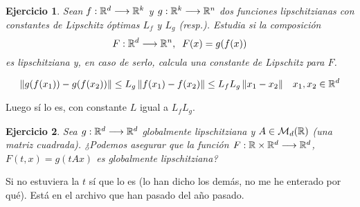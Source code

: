 \documentclass[12pt]{report}
\newtheorem{ejercicio}{Ejercicio}
\theoremstyle{definition}
\theoremstyle{remark}
\begin{document}
\begin{ejercicio}
Sean $f : \mathbb{R}^d \longrightarrow \mathbb{R}^k$ y $g : \mathbb{R}^k \longrightarrow \mathbb{R}^n$ dos funciones lipschitzianas con constantes de Lipschitz óptimas $L_f$ y $L_g$ (resp.). Estudia si la composición
\[
F : \mathbb{R}^d \longrightarrow \mathbb{R}^n, \;\; F(x)=g(f(x))
\]
es lipschitziana y, en caso de serlo, calcula una constante de Lipschitz para $F$.
\end{ejercicio}

\[
\left\lVert g(f(x_1))-g(f(x_2))\right\rVert\leq L_g\left\lVert f(x_1)-f(x_2)\right\rVert\leq L_fL_g\left\lVert x_1-x_2\right\rVert \;\;\; x_1,x_2\in \mathbb{R}^d
\]

Luego sí lo es, con constante $L$ igual a $L_fL_g$.

\begin{ejercicio}
Sea $g : \mathbb{R}^d \longrightarrow \mathbb{R}^d$ globalmente lipschitziana y $A\in\mathcal{M}_d(\mathbb{R})$ (una matriz cuadrada). ¿Podemos asegurar que la función $F : \mathbb{R}\times\mathbb{R}^d \longrightarrow \mathbb{R}^d$, $F(t,x)=g(tAx)$ es globalmente lipschitziana?
\end{ejercicio}

Si no estuviera la $t$ sí que lo es (lo han dicho los demás, no me he enterado por qué).
Está en el archivo que han pasado del año pasado.
\end{document}
